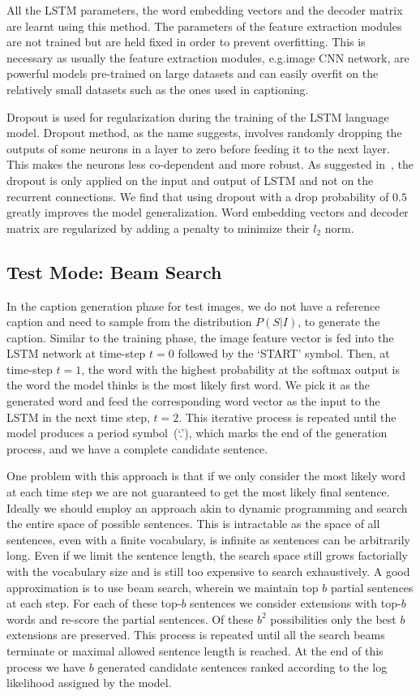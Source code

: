 All the LSTM parameters, the word embedding vectors and the decoder matrix are
learnt using this method.
The parameters of the feature extraction modules are not trained but are held
fixed in order to prevent overfitting.
This is necessary as usually the feature extraction modules, e.g.\@ image CNN
network, are powerful models pre-trained on large datasets and can easily
overfit on the relatively small datasets such as the ones used in captioning.

Dropout is used for regularization during the training of the LSTM language
model.
Dropout method, as the name suggests, involves randomly dropping the outputs
of some neurons in a layer to zero before feeding it to the next layer.
This makes the neurons less co-dependent and more robust.
As suggested in~\cite{ZarembaSV14}, the dropout is only applied on the input and
output of LSTM and not on the recurrent connections.
We find that using dropout with a drop probability of $0.5$ greatly improves the
model generalization.
Word embedding vectors and decoder matrix are regularized by adding a penalty to
minimize their $l_2$ norm.

\subsection{Test Mode: Beam Search}
In the caption generation phase for test images, we do not have a reference
caption and need to sample from the distribution $P(S|I)$, to generate the
caption.
Similar to the training phase, the image feature vector is fed into the LSTM
network at time-step $t=0$ followed by the `START' symbol.
Then, at time-step $t=1$, the word with the highest probability at the softmax
output is the word the model thinks is the most likely first word.
We pick it as the generated word and feed the corresponding word vector as the
input to the LSTM in the next time step, $t=2$.
This iterative process is repeated until the model produces a period
symbol~(`.'), which marks the end of the generation process, and we have a
complete candidate sentence.

One problem with this approach is that if we only consider the most likely word
at each time step we are not guaranteed to get the most likely final sentence.
Ideally we should employ an approach akin to dynamic programming and search the
entire space of possible sentences.
This is intractable as the space of all sentences, even with a finite
vocabulary, is infinite as sentences can be arbitrarily long.
Even if we limit the sentence length, the search space still grows factorially
with the vocabulary size and is still too expensive to search exhaustively.
A good approximation is to use beam search, wherein we maintain top $b$ partial
sentences at each step.
For each of these top-$b$ sentences we consider extensions with top-$b$ words
and re-score the partial sentences.
Of these $b^2$ possibilities only the best $b$ extensions are preserved.
This process is repeated until all the search beams terminate or maximal
allowed sentence length is reached.
At the end of this process we have $b$ generated candidate sentences ranked
according to the log likelihood assigned by the model.

